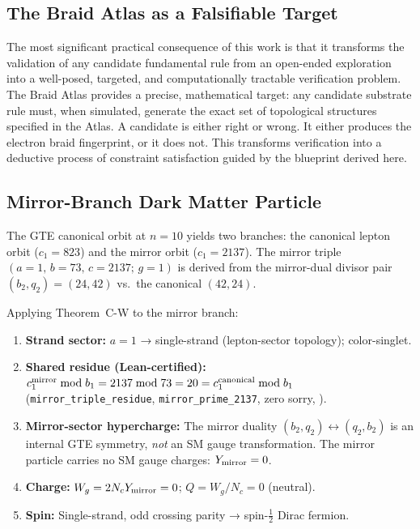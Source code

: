\documentclass[11pt]{article}
\theoremstyle{remark}
\begin{document}
\subsection{The Braid Atlas as a Falsifiable Target}

The most significant practical consequence of this work is that it transforms the validation of any candidate fundamental rule from an open-ended exploration into a well-posed, targeted, and computationally tractable verification problem. The Braid Atlas provides a precise, mathematical target: any candidate substrate rule must, when simulated, generate the exact set of topological structures specified in the Atlas. A candidate is either right or wrong. It either produces the electron braid fingerprint, or it does not. This transforms verification into a deductive process of constraint satisfaction guided by the blueprint derived here.

\subsection{Mirror-Branch Dark Matter Particle}
\label{subsec:mirror_dm}

The GTE canonical orbit at $n{=}10$ yields two branches: the canonical lepton orbit ($c_1 = 823$) and the mirror orbit ($c_1 = 2137$). The mirror triple $(a{=}1,\,b{=}73,\,c{=}2137;\,g{=}1)$ is derived from the mirror-dual divisor pair $(b_2,q_2) = (24,42)$ vs.\ the canonical $(42,24)$.

Applying Theorem~C-W to the mirror branch:
\begin{enumerate}[leftmargin=2em,itemsep=0.2em]
  \item \textbf{Strand sector:} $a = 1$ → single-strand (lepton-sector topology); color-singlet.
  \item \textbf{Shared residue (Lean-certified):} $c_1^{\rm mirror}\bmod b_1 = 2137\bmod 73 = 20 = c_1^{\rm canonical}\bmod b_1$ (\texttt{mirror\_triple\_residue}, \texttt{mirror\_prime\_2137}, zero sorry, \cite{ugp-lean}).
  \item \textbf{Mirror-sector hypercharge:} The mirror duality $(b_2,q_2)\leftrightarrow(q_2,b_2)$ is an internal GTE symmetry, \emph{not} an SM gauge transformation. The mirror particle carries no SM gauge charges: $Y_{\rm mirror} = 0$.
  \item \textbf{Charge:} $W_g = 2N_c Y_{\rm mirror} = 0$; $Q = W_g/N_c = 0$ (neutral).
  \item \textbf{Spin:} Single-strand, odd crossing parity → spin-$\frac{1}{2}$ Dirac fermion.
\end{enumerate}
\end{document}
